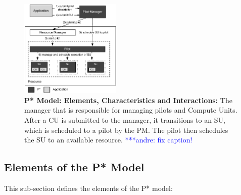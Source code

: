 \documentclass[conference,final]{IEEEtran}
\newcommand{\alnote}[1]{ {\textcolor{blue} { ***andre: #1 }}}
\newcommand{\alnote}[1]{}
\newcommand{\computeunit}{Compute Unit}
\newcommand{\up}{\vspace*{-1em}}
\newcommand{\upp}{\vspace*{-0.5em}}
\begin{document}
\begin{figure}[t]
    \centering\up
    \includegraphics[width=0.43\textwidth]{figures/pstar_model_single.pdf}
    \caption{ \textbf{P* Model: Elements, Characteristics and Interactions:} The 	 	
  	  manager that is responsible for managing
      pilots and \computeunit s. After a CU is submitted to the manager, it
      transitions to an SU, which is scheduled to a pilot by the
      PM. The pilot then schedules the SU to an available
      resource. \alnote{fix caption!}
      \upp\upp}
    \label{fig:figures_pstar}
\end{figure}




%

\noindent 
\subsection{Elements of the P* Model \upp\upp}
\noindent This sub-section defines the elements of the P* model:
\end{document}
